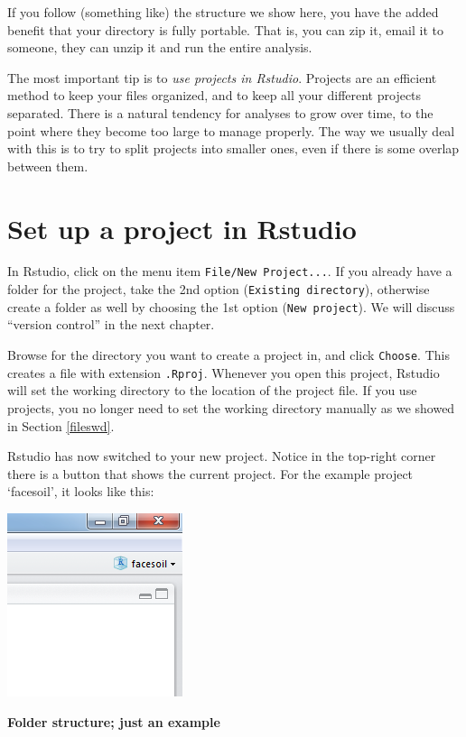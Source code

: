 \documentclass[]{book}
\begin{document}
If you follow (something like) the structure we show here, you have the added benefit that your directory is fully portable. That is, you can zip it, email it to someone, they can unzip it and run the entire analysis.

The most important tip is to \emph{use projects in Rstudio}. Projects are an efficient method to keep your files organized, and to keep all your different projects separated. There is a natural tendency for analyses to grow over time, to the point where they become too large to manage properly. The way we usually deal with this is to try to split projects into smaller ones, even if there is some overlap between them.

\hypertarget{set-up-a-project-in-rstudio-1}{%
\section{Set up a project in Rstudio}\label{set-up-a-project-in-rstudio-1}}

In Rstudio, click on the menu item \texttt{File/New\ Project...}. If you already have a folder for the project, take the 2nd option (\texttt{Existing\ directory}), otherwise create a folder as well by choosing the 1st option (\texttt{New\ project}). We will discuss ``version control'' in the next chapter.

Browse for the directory you want to create a project in, and click \texttt{Choose}. This creates a file with extension \texttt{.Rproj}. Whenever you open this project, Rstudio will set the working directory to the location of the project file. If you use projects, you no longer need to set the working directory manually as we showed in Section \ref{fileswd}.

Rstudio has now switched to your new project. Notice in the top-right corner there is a button that shows the current project. For the example project `facesoil', it looks like this:

\includegraphics[width=0.3\linewidth]{screenshots/projectbutton}

\textbf{Folder structure; just an example}
\end{document}

